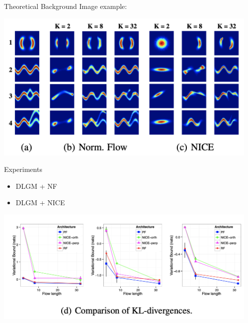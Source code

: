 \documentclass[final,hyperref={pdfpagelabels=false}]{beamer}
\begin{document}
\begin{frame}[t]
\begin{columns}[t]
\begin{column}{.3\textwidth}
\begin{block}{Theoretical Background}
      Image example:
    \end{block}
    
     \begin{center}
        \includegraphics[width=0.9\columnwidth]{EFs}
      \end{center}
      
      \begin{block}{Experiments}
      \begin{itemize}
      	\item DLGM + NF
      	\item DLGM + NICE
      \end{itemize}
      
      \end{block}
      
      
	\begin{center}
        \includegraphics[width=0.9\columnwidth]{varbound}
      \end{center}

  \end{column} %
  


  \begin{column}{.02\textwidth}\end{column} %


\end{columns}
\end{frame}
\end{document}
